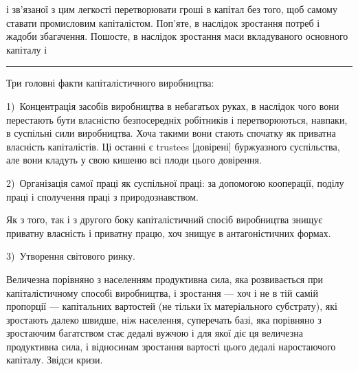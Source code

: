 \parcont{}  %
і зв’язаної з цим легкості перетворювати гроші в капітал без того,
щоб самому ставати промисловим капіталістом. Поп’яте, в наслідок
зростання потреб і жадоби збагачення. Пошосте, в наслідок
зростання маси вкладуваного основного капіталу і~

\pfbreak{}

Три головні факти капіталістичного виробництва:

1)~Концентрація засобів виробництва в небагатьох руках,
в наслідок чого вони перестають бути власністю безпосередніх
робітників і перетворюються, навпаки, в суспільні сили виробництва.
Хоча такими вони стають спочатку як приватна власність
капіталістів. Ці останні є trustees [довірені] буржуазного суспільства,
але вони кладуть у свою кишеню всі плоди цього довірення.

2)~Організація самої праці як суспільної праці: за допомогою
кооперації, поділу праці і сполучення праці з природознавством.

Як з того, так і з другого боку капіталістичний спосіб виробництва
знищує приватну власність і приватну працю, хоч
знищує в антагоністичних формах.

3)~Утворення світового ринку.

Величезна порівняно з населенням продуктивна сила, яка розвивається
при капіталістичному способі виробництва, і зростання
— хоч і не в тій самій пропорції — капітальних вартостей
(не тільки їх матеріального субстрату), які зростають далеко
швидше, ніж населення, суперечать базі, яка порівняно з зростаючим
багатством стає дедалі вужчою і для якої діє ця величезна
продуктивна сила, і відносинам зростання вартості цього
дедалі наростаючого капіталу. Звідси кризи.


